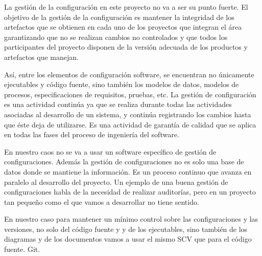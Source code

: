 La gestión de la configuración en este proyecto no va a ser su punto fuerte. El objetivo de la gestión de la configuración es mantener la integridad de los artefactos que se obtienen en cada uno de los proyectos que integran el área garantizando que no se realizan cambios no controlados y que todos los participantes del proyecto disponen de la versión adecuada de los productos y artefactos que manejan. 

Así, entre los elementos de configuración software, se encuentran no únicamente ejecutables y código fuente, sino también los modelos de datos, modelos de procesos, especificaciones de requisitos, pruebas, etc. La gestión de configuración es una actividad continúa ya que se realiza durante todas las actividades asociadas al desarrollo de un sistema, y continúa registrando los cambios hasta que éste deja de utilizarse. Es una actividad de garantía de calidad que se aplica en todas las fases del proceso de ingeniería del software.

En nuestro caos no se va a usar un software específico de gestión de configuraciones. Además la gestión de configuraciones no es solo una base de datos donde se mantiene la información. Es un proceso continuo que avanza en paralelo al desarrollo del proyecto. Un ejemplo de una buena gestión de configuraciones habla de la necesidad de realizar auditorías, pero en un proyecto tan pequeño como el que vamos a desarrollar no tiene sentido.

En nuestro caso para mantener un mínimo control sobre las configuraciones y las versiones, no solo del código fuente y y de los ejecutables, sino también de los diagramas y de los documentos vamos a usar el mismo SCV que para el código fuente. Git. 